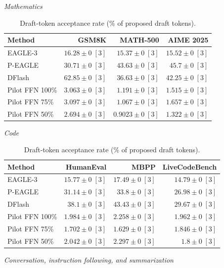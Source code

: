 \begin{table}[!htp]
\centering\small
\setlength{\tabcolsep}{3pt}
\caption{Draft-token acceptance rate (\% of proposed draft tokens).}
\label{tab:appendix-metric-draft-fraction-none}
\textit{Mathematics}\par\smallskip
\begin{tabular}{@{}>{\raggedright\arraybackslash}p{3.7cm}rrr@{}}
\toprule
Method & GSM8K & MATH-500 & AIME 2025 \\
\midrule
EAGLE-3 & \(16.28 \pm 0\;[3]\) & \(15.37 \pm 0\;[3]\) & \(15.52 \pm 0\;[3]\) \\
P-EAGLE & \(30.71 \pm 0\;[3]\) & \(\mathbf{43.63} \pm 0\;[3]\) & \(\mathbf{45.7} \pm 0\;[3]\) \\
DFlash & \(\mathbf{62.85} \pm 0\;[3]\) & \(36.63 \pm 0\;[3]\) & \(42.25 \pm 0\;[3]\) \\
Pilot FFN 100\% & \(3.063 \pm 0\;[3]\) & \(1.191 \pm 0\;[3]\) & \(1.515 \pm 0\;[3]\) \\
Pilot FFN 75\% & \(3.097 \pm 0\;[3]\) & \(1.067 \pm 0\;[3]\) & \(1.657 \pm 0\;[3]\) \\
Pilot FFN 50\% & \(2.694 \pm 0\;[3]\) & \(0.9023 \pm 0\;[3]\) & \(1.322 \pm 0\;[3]\) \\
\bottomrule
\end{tabular}\par\medskip
\textit{Code}\par\smallskip
\begin{tabular}{@{}>{\raggedright\arraybackslash}p{3.7cm}rrr@{}}
\toprule
Method & HumanEval & MBPP & LiveCodeBench \\
\midrule
EAGLE-3 & \(15.77 \pm 0\;[3]\) & \(17.49 \pm 0\;[3]\) & \(14.79 \pm 0\;[3]\) \\
P-EAGLE & \(31.14 \pm 0\;[3]\) & \(33.8 \pm 0\;[3]\) & \(26.98 \pm 0\;[3]\) \\
DFlash & \(\mathbf{38.1} \pm 0\;[3]\) & \(\mathbf{43.43} \pm 0\;[3]\) & \(\mathbf{29.67} \pm 0\;[3]\) \\
Pilot FFN 100\% & \(1.984 \pm 0\;[3]\) & \(2.258 \pm 0\;[3]\) & \(1.962 \pm 0\;[3]\) \\
Pilot FFN 75\% & \(1.702 \pm 0\;[3]\) & \(1.629 \pm 0\;[3]\) & \(1.846 \pm 0\;[3]\) \\
Pilot FFN 50\% & \(2.042 \pm 0\;[3]\) & \(2.297 \pm 0\;[3]\) & \(1.8 \pm 0\;[3]\) \\
\bottomrule
\end{tabular}\par\medskip
\textit{Conversation, instruction following, and summarization}\par\smallskip

\end{table}
